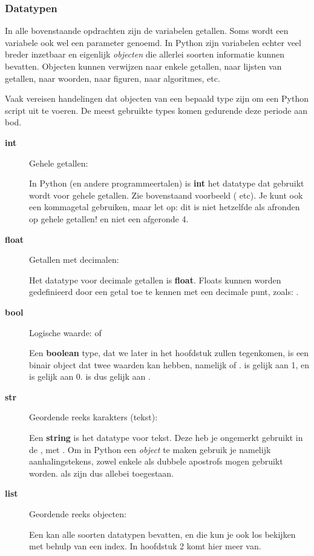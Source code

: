 \documentclass[a4paper,11pt, fleqn]{article}
\begin{document}
\subsubsection{Datatypen}
In alle bovenstaande opdrachten zijn de variabelen getallen. Soms wordt een variabele ook wel een parameter genoemd. In Python zijn variabelen echter veel breder inzetbaar en eigenlijk \textit{objecten} die allerlei soorten informatie kunnen bevatten. Objecten kunnen verwijzen naar enkele getallen, naar lijsten van getallen, naar woorden, naar figuren, naar algoritmes, etc. 

Vaak vereisen handelingen dat objecten van een bepaald type zijn om een Python script uit te voeren. De meest gebruikte types komen gedurende deze periode aan bod. 

\begin{description}
\item[\textbf{int}] Gehele getallen: 

In Python (en andere programmeertalen) is {\bf int} het datatype dat gebruikt wordt voor gehele getallen. Zie bovenstaand voorbeeld ( etc). Je kunt ook een kommagetal gebruiken, maar let op: dit is niet hetzelfde als afronden op gehele getallen!  en niet een afgeronde 4.

\item[\textbf{float}] Getallen met decimalen: 

Het datatype voor decimale getallen is {\bf float}. Floats kunnen worden gedefinieerd door een getal toe te kennen met een decimale punt, zoals: .

\item[\textbf{bool}] Logische waarde:  of 

Een {\bf boolean} type, dat we later in het hoofdstuk zullen tegenkomen, is een binair object dat twee waarden kan hebben, namelijk  of .  is gelijk aan 1, en  is gelijk aan 0.  is dus gelijk aan .

\item[\textbf{str}] Geordende reeks karakters (tekst): 

Een {\bf string} is het datatype voor tekst. Deze heb je ongemerkt gebruikt in de , met . Om in Python een  \textit{object} te maken gebruik je namelijk aanhalingstekens, zowel enkele als dubbele apostrofs mogen gebruikt worden.  als  zijn dus allebei toegestaan.

\item[\textbf{list}] Geordende reeks objecten: \pythoninline{[10, "hello",200.3]}

Een  kan alle soorten datatypen bevatten, en die kun je ook los bekijken met behulp van een index. In hoofdstuk 2 komt hier meer van.

\end{description}
\end{document}
